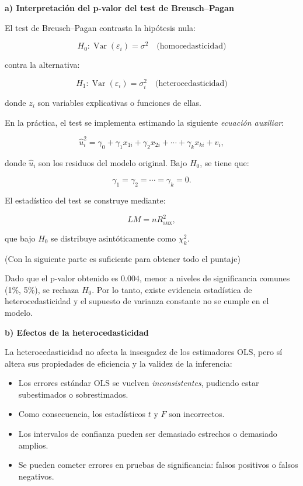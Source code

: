 \documentclass[10pt,a4paper]{article}
\begin{document}
\begin{enumerate}
{\color{blue}  \textbf{a) Interpretación del p-valor del test de Breusch--Pagan}

El test de Breusch--Pagan contrasta la hipótesis nula:

\[
H_0: \operatorname{Var}(\varepsilon_i)=\sigma^2 \quad \text{(homocedasticidad)}
\]

contra la alternativa:

\[
H_1: \operatorname{Var}(\varepsilon_i)=\sigma_i^2  \quad \text{(heterocedasticidad)}
\]

donde $z_i$ son variables explicativas o funciones de ellas.

En la práctica, el test se implementa estimando la siguiente \textit{ecuación auxiliar}:

\[
\hat{u}_i^2 = \gamma_0 + \gamma_1 x_{1i} + \gamma_2 x_{2i} + \cdots + \gamma_k x_{ki} + v_i ,
\]

donde $\hat{u}_i$ son los residuos del modelo original. Bajo $H_0$, se tiene que:

\[
\gamma_1 = \gamma_2 = \cdots = \gamma_k = 0.
\]

El estadístico del test se construye mediante:

\[
LM = n R^2_{\text{aux}},
\]

que bajo $H_0$ se distribuye asintóticamente como $\chi^2_k$.

(Con la siguiente parte  es suficiente para obtener todo el puntaje)

Dado que el p-valor obtenido es $0.004$, menor a niveles de significancia comunes (1\%, 5\%), se rechaza $H_0$. Por lo tanto, existe evidencia estadística de heterocedasticidad y el supuesto de varianza constante no se cumple en el modelo.


\textbf{b) Efectos de la heterocedasticidad}

La heterocedasticidad no afecta la insesgadez de los estimadores OLS, pero sí altera sus propiedades de eficiencia y la validez de la inferencia:

\begin{itemize}
    \item Los errores estándar OLS se vuelven \textit{inconsistentes}, pudiendo estar subestimados o sobrestimados.
    \item Como consecuencia, los estadísticos $t$ y $F$ son incorrectos.
    \item Los intervalos de confianza pueden ser demasiado estrechos o demasiado amplios.
    \item Se pueden cometer errores en pruebas de significancia: falsos positivos o falsos negativos.
\end{itemize}

}
\end{enumerate}
\end{document}
